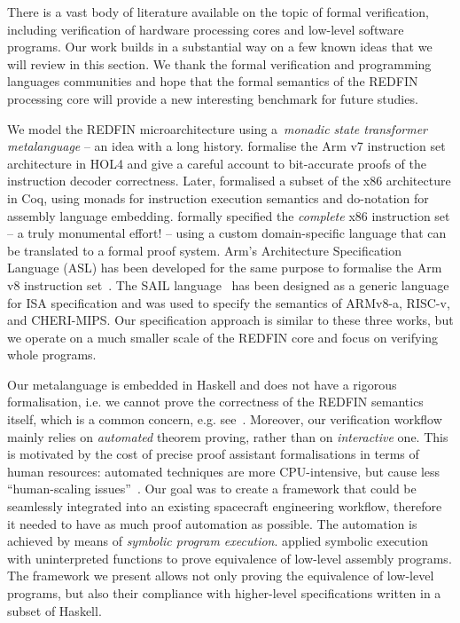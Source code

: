 There is a vast body of literature available on the topic of formal verification,
including verification of hardware processing cores and low-level software programs.
Our work builds in a substantial way on a few known ideas that we will review in
this section. We thank the formal verification and programming languages
communities and hope that the formal semantics of the REDFIN processing core
will provide a new interesting benchmark for future studies.

We model the REDFIN microarchitecture using a~\emph{monadic state transformer
metalanguage} -- an idea with a long history.
\citet{fox2010trustworthy} formalise the Arm v7 instruction
set architecture in HOL4 and give a careful account to bit-accurate proofs of
the instruction decoder correctness. Later, \citet{kennedy2013coq}
formalised a subset of the x86 architecture in Coq, using monads for instruction
execution semantics and \textsf{do}-notation for assembly language embedding.
\citet{degenbaev2012formal} formally specified the \emph{complete} x86
instruction set -- a truly monumental effort! -- using a custom domain-specific
language that can be translated to a formal proof system. Arm's Architecture
Specification Language (ASL) has been developed for the same purpose to formalise the
Arm v8 instruction set~\cite{reid2016cav}. The SAIL language~\cite{SAIL-lang} has
been designed as a generic language for ISA specification and was used to
specify the semantics of ARMv8-a, RISC-v, and CHERI-MIPS.
Our specification approach is similar to these three works, but we operate on a
much smaller scale of the REDFIN core and focus on verifying whole programs.

Our metalanguage is embedded in Haskell and does not have a rigorous
formalisation, i.e. we cannot prove the correctness of the REDFIN semantics
itself, which is a common concern, e.g. see~\citet{reid2017oopsla}. Moreover, our
verification workflow mainly relies on \emph{automated} theorem proving, rather
than on \emph{interactive} one. This is motivated by the cost of precise proof
assistant formalisations in terms of human resources: automated techniques are
more CPU-intensive, but cause less ``human-scaling issues''~\cite{reid2016cav}.
Our goal was to create a framework that could be seamlessly
integrated into an existing spacecraft engineering workflow, therefore it needed
to have as much proof automation as possible. The automation is achieved by means
of \emph{symbolic program execution}. \citet{Currie2006} applied
symbolic execution with uninterpreted functions to prove equivalence of low-level
assembly programs. The framework we present allows not only proving the
equivalence of low-level programs, but also their compliance with higher-level
specifications written in a subset of Haskell.

